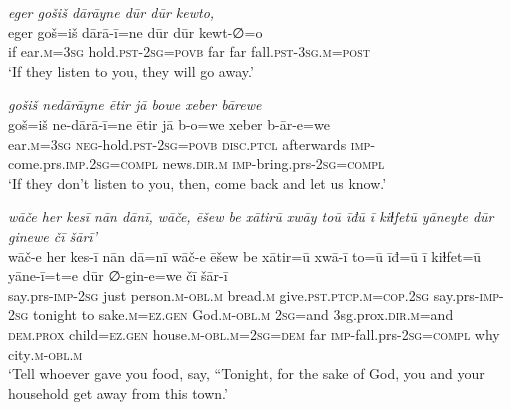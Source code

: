 \ea \label{BP.163}
\textit{eger gošiš dārāyne dūr dūr kewto,} \\ 
\gll eger goš=iš dārā-ī=ne dūr dūr kewt-∅=o \\ 
 if ear\textsc{.m}\textsc{=3sg} hold\textsc{.pst}-\textsc{2sg}\textsc{=\textsc{povb}} far far fall\textsc{.pst}\textsc{-3sg}\textsc{.m}\textsc{=\textsc{post}} \\ 
\glt `If they listen to you, they will go away.'
\z 
 
\ea \label{BP.164}
\textit{gošiš nedārāyne ētir jā bowe xeber bārewe} \\ 
\gll goš=iš ne-dārā-ī=ne ētir jā b-o=we xeber b-ār-e=we \\ 
 ear\textsc{.m}\textsc{=3sg} \textsc{neg-}hold\textsc{.pst}-\textsc{2sg}\textsc{=\textsc{povb}} \textsc{disc.ptcl} afterwards \textsc{imp-}come.prs\textsc{.imp}\textsc{.\textsc{2sg}}\textsc{=compl} news\textsc{.dir}\textsc{.m} \textsc{imp-}bring.prs-\textsc{2sg}\textsc{=compl} \\ 
\glt `If they don’t listen to you, then, come back and let us know.'
\z 
 
\ea \label{BP.165}
\textit{wāče her kesī nān dānī, wāče, ēšew be xātirū xwāy toū īđū ī kiɫfetū yāneyte dūr ginewe čī šārī’} \\ 
\gll wāč-e her kes-ī nān dā=nī wāč-e ēšew be xātir=ū xwā-ī to=ū īđ=ū ī kiɫfet=ū yāne-ī=t=e dūr ∅-gin-e=we čī šār-ī \\ 
 say.prs-\textsc{imp-}\textsc{2sg} just person\textsc{.m}\textsc{-obl}\textsc{.m} bread\textsc{.m} give\textsc{.pst}\textsc{.ptcp}\textsc{.m}\textsc{=cop}\textsc{.\textsc{2sg}} say.prs-\textsc{imp-}\textsc{2sg} tonight to sake\textsc{.m}\textsc{=ez.gen} God\textsc{.m}\textsc{-obl}\textsc{.m} \textsc{2sg}=and 3sg.prox\textsc{.dir}\textsc{.m}=and \textsc{dem.prox} child\textsc{=ez.gen} house\textsc{.m}\textsc{-obl}\textsc{.m}\textsc{=\textsc{2sg}}\textsc{=dem} far \textsc{imp-}fall.prs-\textsc{2sg}\textsc{=compl} why city\textsc{.m}\textsc{-obl}\textsc{.m} \\ 
\glt `Tell whoever gave you food, say, “Tonight, for the sake of God, you and your household get away from this town.'
\z 
 
